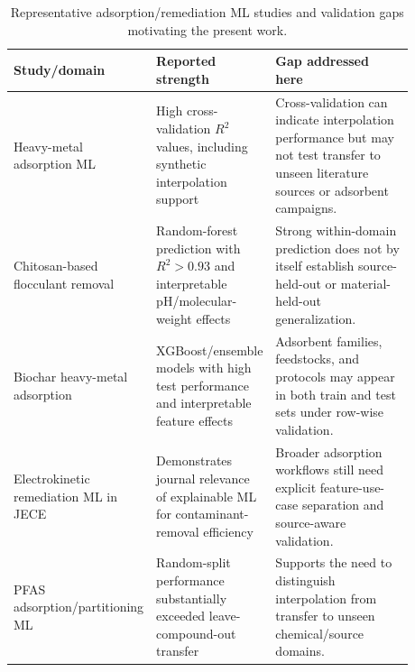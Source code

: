 \documentclass[review,12pt,number]{elsarticle}
\begin{document}
\begin{table}[htbp]
\centering
\caption{Representative adsorption/remediation ML studies and validation gaps motivating the present work.}
\label{tab:lit_gap}
\small
\begin{tabular}{>{\raggedright\arraybackslash}p{0.25\linewidth}>{\raggedright\arraybackslash}p{0.27\linewidth}>{\raggedright\arraybackslash}p{0.36\linewidth}}
\toprule
Study/domain & Reported strength & Gap addressed here \\
\midrule
Heavy-metal adsorption ML \cite{hafsa2020} & High cross-validation $R^2$ values, including synthetic interpolation support & Cross-validation can indicate interpolation performance but may not test transfer to unseen literature sources or adsorbent campaigns. \\
Chitosan-based flocculant removal \cite{lu2022} & Random-forest prediction with $R^2 > 0.93$ and interpretable pH/molecular-weight effects & Strong within-domain prediction does not by itself establish source-held-out or material-held-out generalization. \\
Biochar heavy-metal adsorption \cite{wang2024,yaseen2025} & XGBoost/ensemble models with high test performance and interpretable feature effects & Adsorbent families, feedstocks, and protocols may appear in both train and test sets under row-wise validation. \\
Electrokinetic remediation ML in JECE \cite{barkhordari2024} & Demonstrates journal relevance of explainable ML for contaminant-removal efficiency & Broader adsorption workflows still need explicit feature-use-case separation and source-aware validation. \\
PFAS adsorption/partitioning ML \cite{patel2026} & Random-split performance substantially exceeded leave-compound-out transfer & Supports the need to distinguish interpolation from transfer to unseen chemical/source domains. \\
\bottomrule
\end{tabular}
\end{table}
\end{document}
